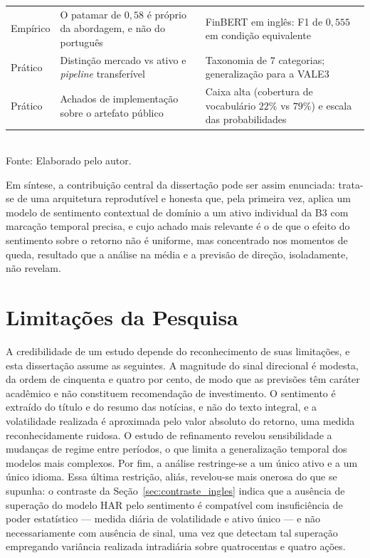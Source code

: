 \begin{table}[htpb]
{\begin{tabular}{p{2.3cm} p{6.3cm} p{5.6cm}}
Empírico & O patamar de $0{,}58$ é próprio da abordagem, e não do português & FinBERT em inglês: F1 de $0{,}555$ em condição equivalente \\
Prático & Distinção mercado vs ativo e \textit{pipeline} transferível & Taxonomia de 7 categorias; generalização para a VALE3 \\
Prático & Achados de implementação sobre o artefato público & Caixa alta (cobertura de vocabulário $22\%$ vs $79\%$) e escala das probabilidades \\ \hline
\end{tabular}%
}
\vspace{0.2cm}
{\small \\ Fonte: Elaborado pelo autor.}
\end{table}

Em síntese, a contribuição central da dissertação pode ser assim enunciada: trata-se de uma arquitetura reprodutível e honesta que, pela primeira vez, aplica um modelo de sentimento contextual de domínio a um ativo individual da B3 com marcação temporal precisa, e cujo achado mais relevante é o de que o efeito do sentimento sobre o retorno não é uniforme, mas concentrado nos momentos de queda, resultado que a análise na média e a previsão de direção, isoladamente, não revelam.

\section{Limitações da Pesquisa}

A credibilidade de um estudo depende do reconhecimento de suas limitações, e esta dissertação assume as seguintes. A magnitude do sinal direcional é modesta, da ordem de cinquenta e quatro por cento, de modo que as previsões têm caráter acadêmico e não constituem recomendação de investimento. O sentimento é extraído do título e do resumo das notícias, e não do texto integral, e a volatilidade realizada é aproximada pelo valor absoluto do retorno, uma medida reconhecidamente ruidosa. O estudo de refinamento revelou sensibilidade a mudanças de regime entre períodos, o que limita a generalização temporal dos modelos mais complexos. Por fim, a análise restringe-se a um único ativo e a um único idioma. Essa última restrição, aliás, revelou-se mais onerosa do que se supunha: o contraste da Seção~\ref{sec:contraste_ingles} indica que a ausência de superação do modelo HAR pelo sentimento é compatível com insuficiência de poder estatístico --- medida diária de volatilidade e ativo único --- e não necessariamente com ausência de sinal, uma vez que  detectam tal superação empregando variância realizada intradiária sobre quatrocentas e quatro ações.

